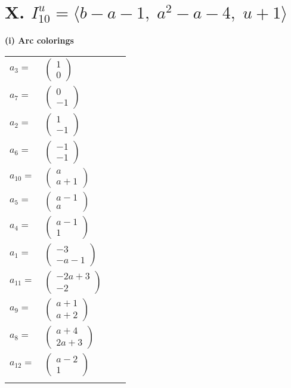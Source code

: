\documentclass[1p]{elsarticle_modified}
\theoremstyle{definition}
\begin{document}
\centering \section*{X. $I^u_{10}= \langle b- a-1,\;a^2- a-4,\;u+1 \rangle$}
\flushleft \textbf{(i) Arc colorings}\\
\begin{tabular}{m{7pt} m{180pt} m{7pt} m{180pt} }
\flushright $a_{3}=$&$\begin{pmatrix}1\\0\end{pmatrix}$ \\
\flushright $a_{7}=$&$\begin{pmatrix}0\\-1\end{pmatrix}$ \\
\flushright $a_{2}=$&$\begin{pmatrix}1\\-1\end{pmatrix}$ \\
\flushright $a_{6}=$&$\begin{pmatrix}-1\\-1\end{pmatrix}$ \\
\flushright $a_{10}=$&$\begin{pmatrix}a\\a+1\end{pmatrix}$ \\
\flushright $a_{5}=$&$\begin{pmatrix}a-1\\a\end{pmatrix}$ \\
\flushright $a_{4}=$&$\begin{pmatrix}a-1\\1\end{pmatrix}$ \\
\flushright $a_{1}=$&$\begin{pmatrix}-3\\- a-1\end{pmatrix}$ \\
\flushright $a_{11}=$&$\begin{pmatrix}-2 a+3\\-2\end{pmatrix}$ \\
\flushright $a_{9}=$&$\begin{pmatrix}a+1\\a+2\end{pmatrix}$ \\
\flushright $a_{8}=$&$\begin{pmatrix}a+4\\2 a+3\end{pmatrix}$ \\
\flushright $a_{12}=$&$\begin{pmatrix}a-2\\1\end{pmatrix}$\\&\end{tabular}
\end{document}
